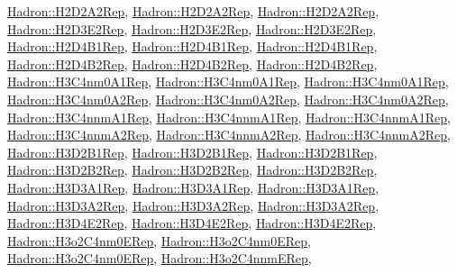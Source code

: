 \mbox{\hyperlink{structHadron_1_1H2D2A2Rep}{Hadron\+::\+H2\+D2\+A2\+Rep}}, \mbox{\hyperlink{structHadron_1_1H2D2A2Rep}{Hadron\+::\+H2\+D2\+A2\+Rep}}, \mbox{\hyperlink{structHadron_1_1H2D2A2Rep}{Hadron\+::\+H2\+D2\+A2\+Rep}}, \mbox{\hyperlink{structHadron_1_1H2D3E2Rep}{Hadron\+::\+H2\+D3\+E2\+Rep}}, \mbox{\hyperlink{structHadron_1_1H2D3E2Rep}{Hadron\+::\+H2\+D3\+E2\+Rep}}, \mbox{\hyperlink{structHadron_1_1H2D3E2Rep}{Hadron\+::\+H2\+D3\+E2\+Rep}}, \mbox{\hyperlink{structHadron_1_1H2D4B1Rep}{Hadron\+::\+H2\+D4\+B1\+Rep}}, \mbox{\hyperlink{structHadron_1_1H2D4B1Rep}{Hadron\+::\+H2\+D4\+B1\+Rep}}, \mbox{\hyperlink{structHadron_1_1H2D4B1Rep}{Hadron\+::\+H2\+D4\+B1\+Rep}}, \mbox{\hyperlink{structHadron_1_1H2D4B2Rep}{Hadron\+::\+H2\+D4\+B2\+Rep}}, \mbox{\hyperlink{structHadron_1_1H2D4B2Rep}{Hadron\+::\+H2\+D4\+B2\+Rep}}, \mbox{\hyperlink{structHadron_1_1H2D4B2Rep}{Hadron\+::\+H2\+D4\+B2\+Rep}}, \mbox{\hyperlink{structHadron_1_1H3C4nm0A1Rep}{Hadron\+::\+H3\+C4nm0\+A1\+Rep}}, \mbox{\hyperlink{structHadron_1_1H3C4nm0A1Rep}{Hadron\+::\+H3\+C4nm0\+A1\+Rep}}, \mbox{\hyperlink{structHadron_1_1H3C4nm0A1Rep}{Hadron\+::\+H3\+C4nm0\+A1\+Rep}}, \mbox{\hyperlink{structHadron_1_1H3C4nm0A2Rep}{Hadron\+::\+H3\+C4nm0\+A2\+Rep}}, \mbox{\hyperlink{structHadron_1_1H3C4nm0A2Rep}{Hadron\+::\+H3\+C4nm0\+A2\+Rep}}, \mbox{\hyperlink{structHadron_1_1H3C4nm0A2Rep}{Hadron\+::\+H3\+C4nm0\+A2\+Rep}}, \mbox{\hyperlink{structHadron_1_1H3C4nnmA1Rep}{Hadron\+::\+H3\+C4nnm\+A1\+Rep}}, \mbox{\hyperlink{structHadron_1_1H3C4nnmA1Rep}{Hadron\+::\+H3\+C4nnm\+A1\+Rep}}, \mbox{\hyperlink{structHadron_1_1H3C4nnmA1Rep}{Hadron\+::\+H3\+C4nnm\+A1\+Rep}}, \mbox{\hyperlink{structHadron_1_1H3C4nnmA2Rep}{Hadron\+::\+H3\+C4nnm\+A2\+Rep}}, \mbox{\hyperlink{structHadron_1_1H3C4nnmA2Rep}{Hadron\+::\+H3\+C4nnm\+A2\+Rep}}, \mbox{\hyperlink{structHadron_1_1H3C4nnmA2Rep}{Hadron\+::\+H3\+C4nnm\+A2\+Rep}}, \mbox{\hyperlink{structHadron_1_1H3D2B1Rep}{Hadron\+::\+H3\+D2\+B1\+Rep}}, \mbox{\hyperlink{structHadron_1_1H3D2B1Rep}{Hadron\+::\+H3\+D2\+B1\+Rep}}, \mbox{\hyperlink{structHadron_1_1H3D2B1Rep}{Hadron\+::\+H3\+D2\+B1\+Rep}}, \mbox{\hyperlink{structHadron_1_1H3D2B2Rep}{Hadron\+::\+H3\+D2\+B2\+Rep}}, \mbox{\hyperlink{structHadron_1_1H3D2B2Rep}{Hadron\+::\+H3\+D2\+B2\+Rep}}, \mbox{\hyperlink{structHadron_1_1H3D2B2Rep}{Hadron\+::\+H3\+D2\+B2\+Rep}}, \mbox{\hyperlink{structHadron_1_1H3D3A1Rep}{Hadron\+::\+H3\+D3\+A1\+Rep}}, \mbox{\hyperlink{structHadron_1_1H3D3A1Rep}{Hadron\+::\+H3\+D3\+A1\+Rep}}, \mbox{\hyperlink{structHadron_1_1H3D3A1Rep}{Hadron\+::\+H3\+D3\+A1\+Rep}}, \mbox{\hyperlink{structHadron_1_1H3D3A2Rep}{Hadron\+::\+H3\+D3\+A2\+Rep}}, \mbox{\hyperlink{structHadron_1_1H3D3A2Rep}{Hadron\+::\+H3\+D3\+A2\+Rep}}, \mbox{\hyperlink{structHadron_1_1H3D3A2Rep}{Hadron\+::\+H3\+D3\+A2\+Rep}}, \mbox{\hyperlink{structHadron_1_1H3D4E2Rep}{Hadron\+::\+H3\+D4\+E2\+Rep}}, \mbox{\hyperlink{structHadron_1_1H3D4E2Rep}{Hadron\+::\+H3\+D4\+E2\+Rep}}, \mbox{\hyperlink{structHadron_1_1H3D4E2Rep}{Hadron\+::\+H3\+D4\+E2\+Rep}}, \mbox{\hyperlink{structHadron_1_1H3o2C4nm0ERep}{Hadron\+::\+H3o2\+C4nm0\+E\+Rep}}, \mbox{\hyperlink{structHadron_1_1H3o2C4nm0ERep}{Hadron\+::\+H3o2\+C4nm0\+E\+Rep}}, \mbox{\hyperlink{structHadron_1_1H3o2C4nm0ERep}{Hadron\+::\+H3o2\+C4nm0\+E\+Rep}}, \mbox{\hyperlink{structHadron_1_1H3o2C4nnmERep}{Hadron\+::\+H3o2\+C4nnm\+E\+Rep}}, 